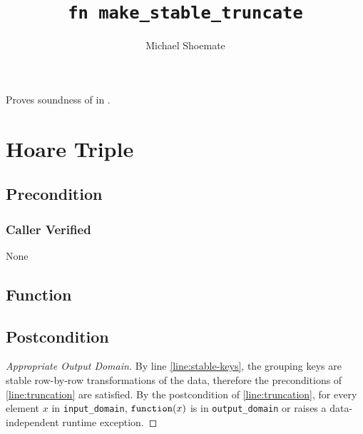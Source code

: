 \documentclass{article}
\title{\texttt{fn make\_stable\_truncate}}
\author{Michael Shoemate}
\begin{document}
\maketitle  


\contrib

Proves soundness of  
in .

\section{Hoare Triple}
\subsection*{Precondition}
\subsubsection*{Caller Verified}
None

\subsection*{Function}
\label{sec:python-pseudocode}


\subsection*{Postcondition}

\begin{proof}[Appropriate Output Domain]
    By line \ref{line:stable-keys},
    the grouping keys are stable row-by-row transformations of the data,
    therefore the preconditions of \ref{line:truncation} are satisfied.
    By the postcondition of \ref{line:truncation},
    for every element $x$ in \texttt{input\_domain}, $\texttt{function}(x)$ is in \texttt{output\_domain} or raises a data-independent runtime exception.
\end{proof}
\end{document}
